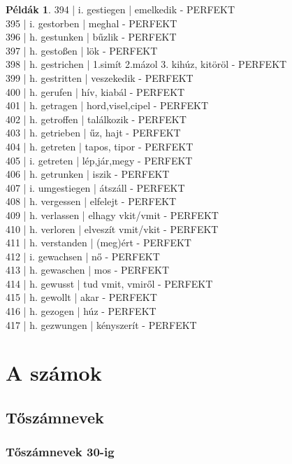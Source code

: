 \documentclass{article}
\theoremstyle{definition}
\newtheorem*{exmp}{Példák}
\begin{document}
\begin{exmp}
394 | i. gestiegen | emelkedik - PERFEKT\\
395 | i. gestorben | meghal - PERFEKT\\
396 | h. gestunken | bűzlik - PERFEKT\\
397 | h. gestoßen | lök - PERFEKT\\
398 | h. gestrichen | 1.simít 2.mázol 3. kihúz, kitöröl - PERFEKT\\
399 | h. gestritten | veszekedik - PERFEKT\\
400 | h. gerufen | hív, kiabál - PERFEKT\\
401 | h. getragen | hord,visel,cipel - PERFEKT\\
402 | h. getroffen | találkozik - PERFEKT\\
403 | h. getrieben | űz, hajt - PERFEKT\\
404 | h. getreten | tapos, tipor - PERFEKT\\
405 | i.  getreten | lép,jár,megy - PERFEKT\\
406 | h. getrunken | iszik - PERFEKT\\
407 | i. umgestiegen | átszáll - PERFEKT\\
408 | h. vergessen | elfelejt - PERFEKT\\
409 | h. verlassen | elhagy vkit/vmit - PERFEKT\\
410 | h. verloren | elveszít vmit/vkit - PERFEKT\\
411 | h. verstanden | (meg)ért - PERFEKT\\
412 | i. gewachsen | nő - PERFEKT\\
413 | h. gewaschen | mos - PERFEKT\\
414 | h. gewusst | tud vmit, vmiről - PERFEKT\\
415 | h. gewollt | akar - PERFEKT\\
416 | h. gezogen | húz - PERFEKT\\
417 | h. gezwungen | kényszerít - PERFEKT\\
\end{exmp}

\section{A számok}

\subsection{Tőszámnevek}

\subsubsection{Tőszámnevek 30-ig}
\end{document}
